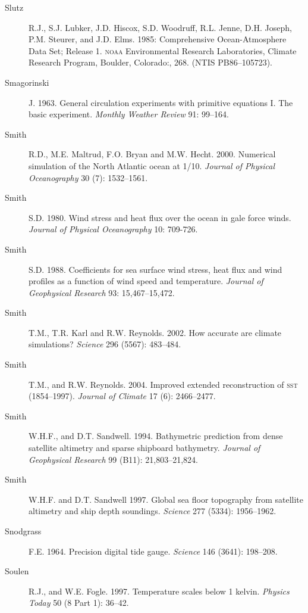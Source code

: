 \begin{description}
\item [Slutz]R.J., S.J. Lubker, J.D. Hiscox, S.D. Woodruff,
  R.L. Jenne, D.H. Joseph, P.M. Steurer, and J.D. Elms. 1985:
  Comprehensive Ocean-Atmosphere Data Set; Release 1. \textsc{noaa}
  Environmental Research Laboratories, Climate Research Program,
  Boulder, Colorado:, 268. (NTIS PB86--105723).

\item [Smagorinski]J. 1963. General circulation experiments with
  primitive equations I. The basic experiment. \textit{Monthly Weather
    Review} 91: 99--164.

\item [Smith]R.D., M.E. Maltrud, F.O. Bryan and
  M.W. Hecht. 2000. Numerical simulation of the North Atlantic ocean
  at 1/10\degrees. \textit{Journal of Physical Oceanography} 30 (7):
  1532--1561.

\item [Smith]S.D. 1980. Wind stress and heat flux over the ocean in
  gale force winds. \textit{Journal of Physical Oceanography} 10:
  709-726.
	
\item [Smith]S.D. 1988. Coefficients for sea surface wind stress, heat
  flux and wind profiles as a function of wind speed and
  temperature. \textit{Journal of Geophysical Research} 93:
  15,467--15,472.

\item [Smith]T.M., T.R. Karl and R.W. Reynolds. 2002. How accurate are
  climate simulations? \textit{Science} 296 (5567): 483--484.

\item [Smith]T.M., and R.W. Reynolds. 2004. Improved extended
  reconstruction of \textsc{sst} (1854--1997). \textit{Journal of
    Climate} 17 (6): 2466--2477.
	
\item [Smith]W.H.F., and D.T. Sandwell. 1994. Bathymetric prediction
  from dense satellite altimetry and sparse shipboard
  bathymetry. \textit{Journal of Geophysical Research} 99 (B11):
  21,803--21,824.

\item [Smith]W.H.F. and D.T. Sandwell 1997. Global sea floor
  topography from satellite altimetry and ship depth
  soundings. \textit{Science} 277 (5334): 1956--1962.

\item[Snodgrass]F.E. 1964. Precision digital tide
  gauge. \textit{Science} 146 (3641): 198--208.

\item [Soulen]R.J., and W.E. Fogle. 1997. Temperature scales below 1
  kelvin. \textit{Physics Today} 50 (8 Part 1): 36--42.


\end{description}
